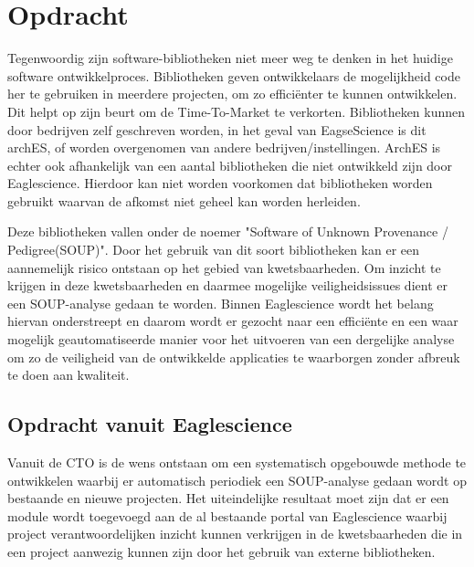 
\chapter{Opdracht}\label{ch:opdracht} %

Tegenwoordig zijn software-bibliotheken niet meer weg te denken in het huidige software ontwikkelproces.
Bibliotheken geven ontwikkelaars de mogelijkheid code her te gebruiken in meerdere projecten, om zo efficiënter te kunnen ontwikkelen.
Dit helpt op zijn beurt om de Time-To-Market te verkorten.
Bibliotheken kunnen door bedrijven zelf geschreven worden, in het geval van EagseScience is dit archES, of worden overgenomen van andere bedrijven/instellingen.
ArchES is echter ook afhankelijk van een aantal bibliotheken die niet ontwikkeld zijn door Eaglescience.
Hierdoor kan niet worden voorkomen dat bibliotheken worden gebruikt waarvan de afkomst niet geheel kan worden herleiden.

Deze bibliotheken vallen onder de noemer "Software of Unknown Provenance / Pedigree(SOUP)".
Door het gebruik van dit soort bibliotheken kan er een aannemelijk risico ontstaan op het gebied van kwetsbaarheden.
Om inzicht te krijgen in deze kwetsbaarheden en daarmee mogelijke veiligheidsissues dient er een SOUP-analyse gedaan te worden.
Binnen Eaglescience wordt het belang hiervan onderstreept en daarom wordt er gezocht naar een efficiënte en een waar mogelijk geautomatiseerde manier voor het uitvoeren van een dergelijke analyse om zo de veiligheid van de ontwikkelde applicaties te waarborgen zonder afbreuk te doen aan kwaliteit.

\section{Opdracht vanuit Eaglescience}\label{sec:opdracht-vanuit-eaglescience}
Vanuit de CTO is de wens ontstaan om een systematisch opgebouwde methode te ontwikkelen waarbij er automatisch periodiek een SOUP-analyse gedaan wordt op bestaande en nieuwe projecten.
Het uiteindelijke resultaat moet zijn dat er een module wordt toegevoegd aan de al bestaande portal van Eaglescience waarbij project verantwoordelijken inzicht kunnen verkrijgen in de kwetsbaarheden die in een project aanwezig kunnen zijn door het gebruik van externe bibliotheken.

